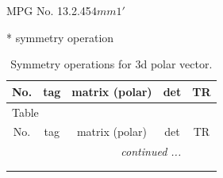 \documentclass[fleqn,8pt]{jsarticle}
\begin{document}
\setcounter{MaxMatrixCols}{32}

\renewcommand{\tablename}{Table~}
\renewcommand{\figurename}{Figure~}
\begin{center}
\LARGE
MPG No. 13.2.45\quad$4mm1'$
\end{center}
* symmetry operation
\renewcommand{\arraystretch}{1.3}
\begin{longtable}{ccccc}
\caption{Symmetry operations for 3d polar vector.}
 \\
 \hline \hline
No. & tag & matrix (polar) & det & TR \\ \hline \endfirsthead

\multicolumn{4}{l}{\tablename\ \thetable{}} \\
 \hline \hline
No. & tag & matrix (polar) & det & TR \\ \hline \endhead

 \hline \hline
\multicolumn{4}{r}{\footnotesize\it continued ...} \\ \endfoot

 \hline \hline
\multicolumn{4}{r}{} \\ \endlastfoot


\end{longtable}
\end{document}
